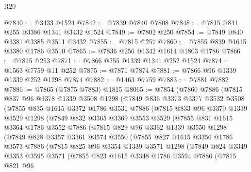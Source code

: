 \begin{lexlean}{R20}
\begin{coremodule}
@7840 := @3433 @1524
@7842 := @7839 @7840 @7808
@7848 := @7815 @841 @255 @3386 @1341 @3432 @1524
@7849 := @7802 @250
@7854 := @7849 @840 @3381 @3385 @3511 @3432
@7855 := @7815 @257
@7860 := @7855 @839 @1615 @3380 @1786 @3510
@7865 := @7836 @256 @1342 @1614 @1803 @1786
@7866 := @7815 @253
@7871 := @7866 @255 @1339 @1341 @252 @1524
@7874 := @1563 @7759 @11 @252
@7875 := @7871 @7874
@7881 := @7866 @96 @1339 @1339 @252 @1298 @7874
@7882 := @1463 @7759
@7883 := @7881 @7882
@7886 := @7865 (@7875 @7883) @1815
@8065 := @7854
    (@7860
      @7886
      (@7815
        @837
        @96
        @3378
        @1339
        @3508
        @1298
        (@7849
          @836
          @3373
          @3377
          @3532
          @3508
          (@7855
            @835
            @1615
            @3372
            @1786
            @3531
            @7886
            (@7815
              @833
              @96
              @3370
              @1339
              @3529
              @1298
              (@7849
                @832
                @3365
                @3369
                @3553
                @3529
                (@7855
                  @831
                  @1615
                  @3364
                  @1786
                  @3552
                  @7886
                  (@7815
                    @829
                    @96
                    @3362
                    @1339
                    @3550
                    @1298
                    (@7849
                      @828
                      @3357
                      @3361
                      @3574
                      @3550
                      (@7855
                        @827
                        @1615
                        @3356
                        @1786
                        @3573
                        @7886
                        (@7815
                          @825
                          @96
                          @3354
                          @1339
                          @3571
                          @1298
                          (@7849
                            @824
                            @3349
                            @3353
                            @3595
                            @3571
                            (@7855
                              @823
                              @1615
                              @3348
                              @1786
                              @3594
                              @7886
                              (@7815
                                @821
                                @96

\end{coremodule}
\end{lexlean}
